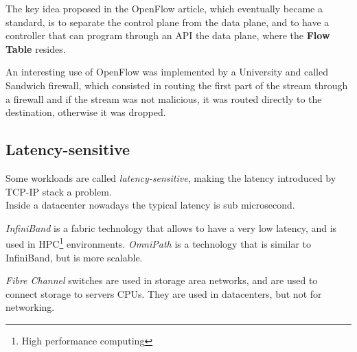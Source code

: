 The key idea proposed in the OpenFlow article, which eventually became a standard, is to separate the control plane from the data plane, and to have a controller that can program through an API the data plane, where the \textbf{Flow Table} resides.

An interesting use of OpenFlow was implemented by a University and called Sandwich firewall, which consisted in routing the first part of the stream through a firewall and if the stream was not malicious, it was routed directly to the destination, otherwise it was dropped.

\subsection*{Latency-sensitive}
Some workloads are called \textit{latency-sensitive}, making the latency introduced by TCP-IP stack a problem.\\
Inside a datacenter nowadays the typical latency is sub microsecond.

\textit{InfiniBand} is a fabric technology that allows to have a very low latency, and is used in HPC\footnote{High performance computing} environments. \textit{OmniPath} is a technology that is similar to InfiniBand, but is more scalable.

\textit{Fibre Channel} switches are used in storage area networks, and are used to connect storage to servers CPUs. They are used in datacenters, but not for networking.
